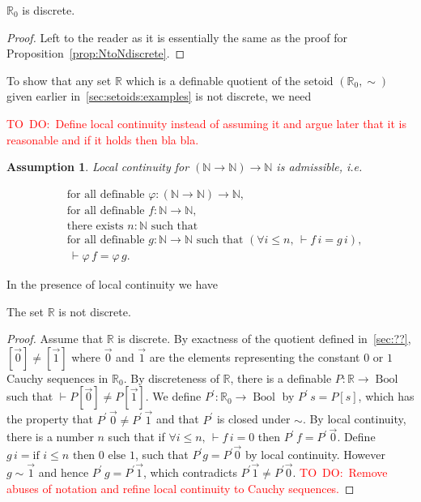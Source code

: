 \documentclass[envcountsame]{llncs}
\newcommand{\todo}[1]{\textcolor{red}{TO~DO:~#1}}
\newtheorem{assumption}[theorem]{Assumption}
\newcommand{\N}{\mathbb{N}}
\newcommand{\R}{\mathbb{R}}
\providecommand{\class}[1]{[#1]}
\DeclareMathOperator{\Bool}{Bool}
\begin{document}
\begin{proposition}
 $\R_0$ is discrete.
\end{proposition}
\begin{proof}
Left to the reader as it is essentially the same as the proof for Proposition~\ref{prop:NtoNdiscrete}.
\end{proof}
To show that any set $\R$ which is a definable quotient of the setoid $(\R_0,\sim)$ given earlier in~\ref{sec:setoids:examples} is not discrete, we need

\todo{Define local continuity instead of assuming it and argue later that it is reasonable and if it holds then bla bla.}
\begin{assumption}
Local continuity  for $(\N \to \N) \to \N$ is admissible, i.e.

\newcommand{\fad}{\text{for all definable }}
\begin{align*}
   &\fad \varphi : (\N \to \N) \to \N,\\
   &\fad f : \N \to \N,\\
   &\text{there exists }  n:\N\text{ such that }\\
   &\fad g : \N \to \N \text{ such that } (\forall i\leq n,\, \vdash f\,i = g\,i),\\
   &{\,\vdash \varphi\, f} = \varphi\, g.
\end{align*}
\end{assumption}

In the presence of local continuity we have 
\begin{proposition}\label{prop:Rnotdiscrete} The set $\R$ is not discrete.
\end{proposition}
\begin{proof}
Assume that $\R$ is discrete. By exactness of the quotient defined in~\ref{sec:??}, $\class{\vec 0} \neq \class{\vec 1}$ where $\vec 0$ and $\vec 1$ are the elements representing the constant $0$ or $1$ Cauchy sequences in $\R_0$. By discreteness of $\R$, there is a definable $P:\R\to\Bool$ 
such that $\vdash P\class{\vec 0}\neq P\class{\vec 1 }$. We define $P^\prime:\R_0\to\Bool$ by $P^\prime\,s = P\class{s}$, which has the property that $P^\prime\,\vec0\neq P^\prime\,\vec 1$ and that $P^\prime$ is closed under $\sim$. By local continuity, there is a number $n$  such that if $\forall i\leq n,\, \vdash f\,i = 0$ then $P^\prime \, f = P^\prime\,\vec 0$. Define $g\,i=\text{if } i\leq n \text{ then } 0 \text{ else } 1$, such that $P^\prime g =P^\prime \vec 0$ by local continuity. However $g \sim \vec 1$ and hence $P^\prime\,g=P^\prime \vec 1$, which contradicts $P^\prime \vec 1 \neq P^\prime \vec 0$. 
\todo{Remove abuses of notation and refine local continuity to Cauchy sequences.}
\end{proof}
\end{document}
